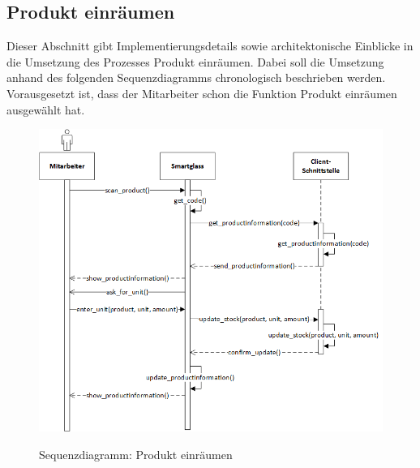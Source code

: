 \subsection{Produkt einräumen}
Dieser Abschnitt gibt Implementierungsdetails sowie architektonische Einblicke in die Umsetzung des Prozesses \glqq Produkt einräumen\grqq . Dabei soll die Umsetzung anhand des folgenden Sequenzdiagramms chronologisch beschrieben werden. Vorausgesetzt ist, dass der Mitarbeiter schon die Funktion \glqq Produkt einräumen\grqq~ ausgewählt hat. 

\begin{figure}[H]
	\centering
	{\includegraphics[scale=0.7]{Bilder/Abbildungen/SMAR_produkt_einraeumen_Sequenzdiagramm.png}}
	\caption{Sequenzdiagramm: Produkt einräumen}
	\label{fig:sequenz_einraeumen}
\end{figure}

